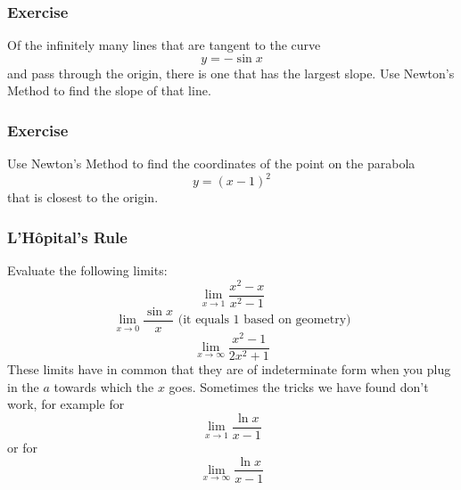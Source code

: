\documentclass[xcolor=dvipsnames]{beamer}
\begin{document}
\begin{frame}
  \frametitle{Exercise}
{\ubung} Of the infinitely many lines that are tangent to the curve
\begin{equation}
  \label{eq:ohtooyiv}
  y=-\sin{}x
\end{equation}
and pass through the origin, there is one that has the largest slope.
Use Newton's Method to find the slope of that line.
\end{frame}

\begin{frame}
  \frametitle{Exercise}
{\ubung} Use Newton's Method to find the coordinates of the point on
the parabola
\begin{equation}
  \label{eq:laingiun}
  y=(x-1)^{2}
\end{equation}
that is closest to the origin.
\end{frame}



\begin{frame}
  \frametitle{L'H{\^o}pital's Rule}
Evaluate the following limits:
\begin{equation}
  \label{eq:ohjishah}
  \lim_{x\rightarrow{}1}\frac{x^{2}-x}{x^{2}-1}
\end{equation}
\begin{equation}
  \label{eq:eighahth}
  \lim_{x\rightarrow{}0}\frac{\sin{}x}{x}\mbox{ (it equals 1 based on geometry)}
\end{equation}
\begin{equation}
  \label{eq:aiwohmae}
  \lim_{x\rightarrow\infty}\frac{x^{2}-1}{2x^{2}+1}
\end{equation}
These limits have in common that they are of \alert{indeterminate
  form} when you plug in the $a$ towards which the $x$ goes. Sometimes
the tricks we have found don't work, for example for
\begin{equation}
  \label{eq:jechuith}
  \lim_{x\rightarrow{}1}\frac{\ln{}x}{x-1}
\end{equation}
or for
\begin{equation}
  \label{eq:ieghaegh}
  \lim_{x\rightarrow{}\infty}\frac{\ln{}x}{x-1}
\end{equation}
\end{frame}
\end{document}

